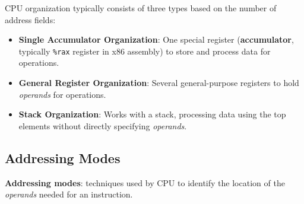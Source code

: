 \documentclass[12pt, letterpaper]{article}
\begin{document}
CPU organization typically consists of three types based on the number of address fields:
\begin{itemize}
    \item \textbf{Single Accumulator Organization}: One special register (\textbf{accumulator}, typically \texttt{\%rax} register in x86 assembly) to store and process data for operations.
    \item \textbf{General Register Organization}: Several general-purpose registers to hold \textit{operands} for operations.
    \item \textbf{Stack Organization}: Works with a stack, processing data using the top elements without directly specifying \textit{operands}.
\end{itemize}

\subsection*{Addressing Modes}

\textbf{Addressing modes}: techniques used by CPU to identify the location of the \textit{operands} needed for an instruction.
\end{document}
